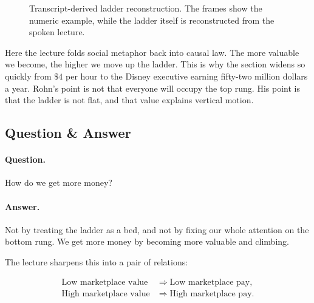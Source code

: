 \begin{figure}[h]
\centering
{}
\caption{Transcript-derived ladder reconstruction. The frames show the numeric example, while the ladder itself is reconstructed from the spoken lecture.}
\end{figure}

Here the lecture folds social metaphor back into causal law. The more valuable we become, the higher we move up the ladder. This is why the section widens so quickly from \(\$4\) per hour to the Disney executive earning fifty-two million dollars a year. Rohn's point is not that everyone will occupy the top rung. His point is that the ladder is not flat, and that value explains vertical motion.

\subsection{Question \& Answer}

\paragraph{Question.} How do we get more money?

\paragraph{Answer.} Not by treating the ladder as a bed, and not by fixing our whole attention on the bottom rung. We get more money by becoming more valuable and climbing.

The lecture sharpens this into a pair of relations:

\begin{align}
\text{Low marketplace value} &\Longrightarrow \text{Low marketplace pay},\\
\text{High marketplace value} &\Longrightarrow \text{High marketplace pay}.
\end{align}

